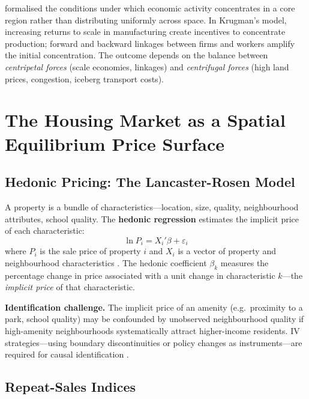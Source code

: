 \citet{Krugman1991} formalised the conditions under which economic activity
concentrates in a core region rather than distributing uniformly across space.
In Krugman's model, increasing returns to scale in manufacturing create
incentives to concentrate production; forward and backward linkages between
firms and workers amplify the initial concentration. The outcome depends on
the balance between \emph{centripetal forces} (scale economies, linkages)
and \emph{centrifugal forces} (high land prices, congestion, iceberg transport
costs).



\section{The Housing Market as a Spatial Equilibrium Price Surface}
\label{sec_HousingMarket}

\subsection{Hedonic Pricing: The Lancaster-Rosen Model}

A property is a bundle of characteristics---location, size, quality,
neighbourhood attributes, school quality. The \textbf{hedonic regression}
 estimates the implicit price of each characteristic:
\begin{equation}
  \ln P_i = X_i'\beta + \varepsilon_i
\end{equation}
where $P_i$ is the sale price of property $i$ and $X_i$ is a vector of
property and neighbourhood characteristics \citep{Lancaster1966, Rosen1974}.
The hedonic coefficient $\beta_k$ measures the percentage change in price
associated with a unit change in characteristic $k$---the \emph{implicit
price} of that characteristic.

\noindent\textbf{Identification challenge.} The implicit price of an amenity
(e.g.\ proximity to a park, school quality) may be confounded by unobserved
neighbourhood quality if high-amenity neighbourhoods systematically attract
higher-income residents. IV strategies---using boundary discontinuities
or policy changes as instruments---are required for causal identification
\citep{Black1999}.

\subsection{Repeat-Sales Indices}

